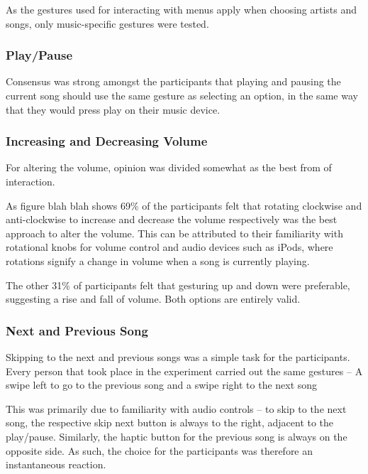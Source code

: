 \documentclass{l4proj}
\begin{document}
As the gestures used for interacting with menus apply when choosing artists and songs, only music-specific gestures were tested. 

\subsubsection{Play/Pause}
\vspace{-3mm}
Consensus was strong amongst the participants that playing and pausing the current song should use the same gesture as selecting an option, in the same way that they would press play on their music device.

\subsubsection{Increasing and Decreasing Volume}
\vspace{-3mm}

For altering the volume, opinion was divided somewhat as the best from of interaction. 

As figure blah blah shows 69\% of the participants felt that rotating clockwise and anti-clockwise to increase and decrease the volume respectively was the best approach to alter the volume. This can be attributed to their familiarity with rotational knobs for volume control and audio devices such as iPods, where rotations signify a change in volume when a song is currently playing.

The other 31\% of participants felt that gesturing up and down were preferable, suggesting a rise and fall of volume. Both options are entirely valid.

\subsubsection{Next and Previous Song}
\vspace{-3mm}

Skipping to the next and previous songs was a simple task for the participants. Every person that took place in the experiment carried out the same gestures -- A swipe left to go to the previous song and a swipe right to the next song

This was primarily due to familiarity with audio controls – to skip to the next song, the respective skip next button is always to the right, adjacent to the play/pause. Similarly, the haptic button for the previous song is always on the opposite side. As such, the choice for the participants was therefore an instantaneous reaction.
\end{document}
